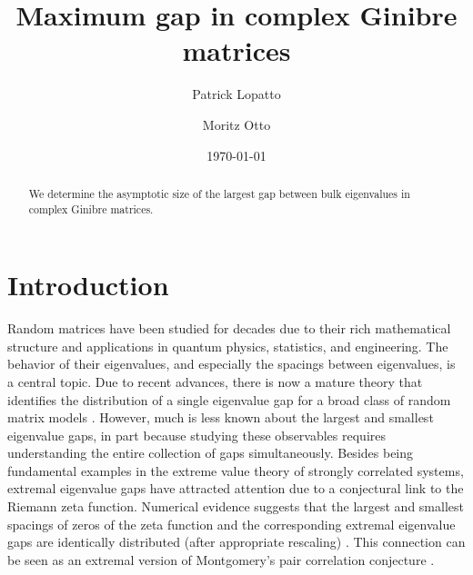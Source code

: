 \documentclass{amsart}
\theoremstyle{plain}
\theoremstyle{definition}
\theoremstyle{remark}
\begin{document}
 
\author{Patrick Lopatto}
\address{Department of Statistics and Operations Research, University of North Carolina at Chapel Hill, United States}
\author{Moritz Otto}
\address{Mathematical Institute, Leiden University, The Netherlands}




\title{Maximum gap in complex Ginibre matrices} 
\date{\today}
\begin{abstract} 
We determine the asymptotic size of the largest gap between bulk eigenvalues in complex Ginibre matrices. 
\end{abstract}
\maketitle



\section{Introduction}\label{sec:intro}

Random matrices have been studied for decades due to their rich mathematical structure and applications in quantum physics, statistics, and engineering. The behavior of their eigenvalues, and especially the spacings between eigenvalues, is a central topic. Due to recent advances, there is now a mature theory that identifies the distribution of a single eigenvalue gap for a broad class of random matrix models \cite{erdos2019matrix,erdHos2017dynamical}. 
However, much is less known about the largest and smallest eigenvalue gaps, in part because studying these observables requires understanding the entire collection of gaps simultaneously. Besides being fundamental examples in the extreme value theory of strongly correlated systems, extremal eigenvalue gaps have attracted attention due to a conjectural link to the Riemann zeta function. 
Numerical evidence suggests that the largest and smallest spacings of zeros of the zeta function and the corresponding extremal eigenvalue gaps are identically distributed (after appropriate rescaling) \cite{odlyzko1987distribution,ben2013extreme}. This connection can be seen as an extremal version of Montgomery's pair correlation conjecture \cite{montgomery1973pair}. 
\end{document}
